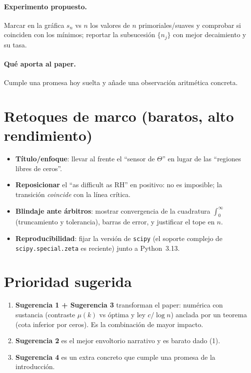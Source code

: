 \documentclass[11pt]{article}
\theoremstyle{plain}
\theoremstyle{definition}
\theoremstyle{remark}
\begin{document}
\paragraph{Experimento propuesto.} Marcar en la gr\'afica $s_n$ vs $n$ los valores de $n$
primoriales/suaves y comprobar si coinciden con los m\'inimos; reportar la subsucesi\'on
$\{n_j\}$ con mejor decaimiento y su tasa.

\paragraph{Qu\'e aporta al paper.} Cumple una promesa hoy suelta y a\~nade una observaci\'on
aritm\'etica concreta.

\bigskip

\section*{Retoques de marco (baratos, alto rendimiento)}
\begin{itemize}[leftmargin=*]
  \item \textbf{T\'itulo/enfoque}: llevar al frente el ``sensor de $\Theta$'' en lugar de las
        ``regiones libres de ceros''.
  \item \textbf{Reposicionar} el ``as difficult as RH'' en positivo: no es imposible; la transici\'on
        \emph{coincide} con la l\'inea cr\'itica.
  \item \textbf{Blindaje ante \'arbitros}: mostrar convergencia de la cuadratura $\int_0^\infty$
        (truncamiento y tolerancia), barras de error, y justificar el tope en $n$.
  \item \textbf{Reproducibilidad}: fijar la versi\'on de \texttt{scipy} (el soporte complejo de
        \texttt{scipy.special.zeta} es reciente) junto a Python~3.13.
\end{itemize}

\bigskip

\section*{Prioridad sugerida}
\begin{enumerate}[leftmargin=*]
  \item \textbf{Sugerencia 1 + Sugerencia 3} transforman el paper: numérica con sustancia
        (contraste $\mu(k)$ vs \'optima y ley $c/\log n$) anclada por un teorema (cota inferior por
        ceros). Es la combinaci\'on de mayor impacto.
  \item \textbf{Sugerencia 2} es el mejor envoltorio narrativo y es barato dado (1).
  \item \textbf{Sugerencia 4} es un extra concreto que cumple una promesa de la introducci\'on.
\end{enumerate}
\end{document}
